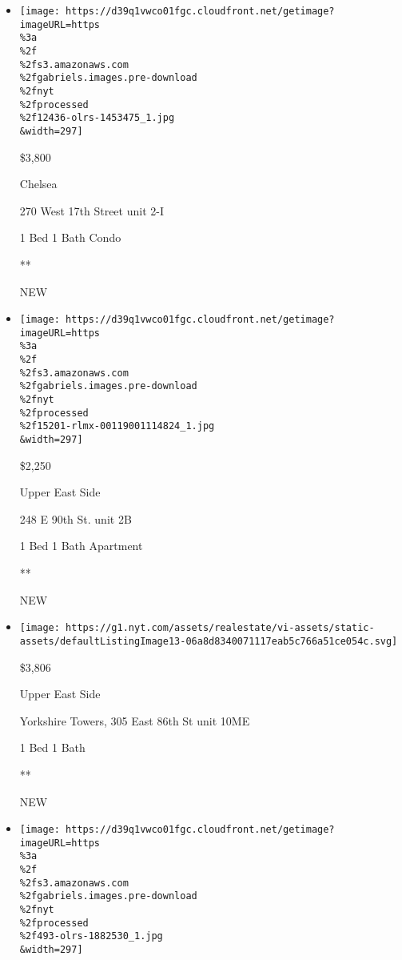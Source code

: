 \begin{itemize}
\item
  \href{/real-estate/usa/ny/new-york/chelsea/homes-for-rent/270-west-17th-street/12436-OLRS-1453475?}{}

  \texttt{[image: https://d39q1vwco01fgc.cloudfront.net/getimage?imageURL=https\\\%3a\\\%2f\\\%2fs3.amazonaws.com\\\%2fgabriels.images.pre-download\\\%2fnyt\\\%2fprocessed\\\%2f12436-olrs-1453475\_1.jpg\\\&width=297]}

  \$3,800

  Chelsea

  270 West 17th Street unit 2-I

  1 Bed \textbar{} 1 Bath \textbar{} Condo

  **

  NEW
\item
  \href{/real-estate/usa/ny/new-york/upper-east-side/homes-for-rent/248-e-90th-st/15201-RLMX-00119001114824?}{}

  \texttt{[image: https://d39q1vwco01fgc.cloudfront.net/getimage?imageURL=https\\\%3a\\\%2f\\\%2fs3.amazonaws.com\\\%2fgabriels.images.pre-download\\\%2fnyt\\\%2fprocessed\\\%2f15201-rlmx-00119001114824\_1.jpg\\\&width=297]}

  \$2,250

  Upper East Side

  248 E 90th St. unit 2B

  1 Bed \textbar{} 1 Bath \textbar{} Apartment

  **

  NEW
\item
  \href{/real-estate/usa/ny/new-york/upper-east-side/homes-for-rent/yorkshire-towers-305-east-86th-st/46-4322149?}{}

  \texttt{[image: https://g1.nyt.com/assets/realestate/vi-assets/static-assets/defaultListingImage13-06a8d8340071117eab5c766a51ce054c.svg]}

  \$3,806

  Upper East Side

  Yorkshire Towers, 305 East 86th St unit 10ME

  1 Bed \textbar{} 1 Bath \textbar{}

  **

  NEW
\item
  \href{/real-estate/usa/ny/new-york/financial-district/homes-for-rent/15-william-street/493-OLRS-1882530?}{}

  \texttt{[image: https://d39q1vwco01fgc.cloudfront.net/getimage?imageURL=https\\\%3a\\\%2f\\\%2fs3.amazonaws.com\\\%2fgabriels.images.pre-download\\\%2fnyt\\\%2fprocessed\\\%2f493-olrs-1882530\_1.jpg\\\&width=297]}


\end{itemize}

